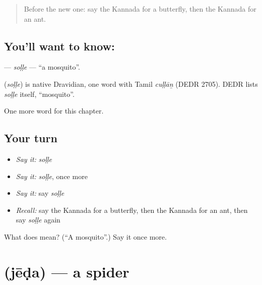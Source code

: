 \label{lesson:KA-C132-solle}



\begin{quote}
Before the new one: say the Kannada for a butterfly, then the Kannada for an ant.
\end{quote}

\subsection*{You'll want to know: }
\textbf{} — \emph{soḷḷe} — \textquotedblleft{}a mosquito\textquotedblright{}.

\begin{cousinweb}
\textbf{} (\emph{soḷḷe}) is native Dravidian, one word with Tamil \emph{cuḷḷāṉ} (DEDR 2705). DEDR lists \emph{soḷḷe} itself, \textquotedblleft{}mosquito\textquotedblright{}.
\end{cousinweb}

\begin{grammarlens}[title={What you've built}]
One more word for this chapter.
\end{grammarlens}

\subsection*{Your turn}
\begin{itemize}
\raggedright
  \item \emph{Say it:} \emph{soḷḷe}
  \item \emph{Say it:} \emph{soḷḷe}, once more
  \item \emph{Say it:} say \emph{soḷḷe}
  \item \emph{Recall:} say the Kannada for a butterfly, then the Kannada for an ant, then say \emph{soḷḷe} again
\end{itemize}

\begin{tcolorbox}[breakable,colback=teal!4,colframe=teal!35!black,title={Before you move on}]
What does  mean? (\textquotedblleft{}A mosquito\textquotedblright{}.) Say it once more.
\end{tcolorbox}
\section[\texorpdfstring{\kn{ಜೇಡ} (jēḍa)}{ಜೇಡ (jēḍa)}]{ (jēḍa) — a spider}

\label{lesson:KA-C132-jeda}



